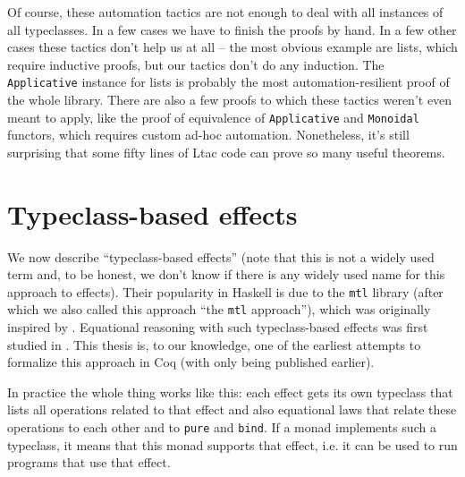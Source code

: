 \documentclass[declaration,inz,english,shortabstract]{iithesis}
\newcommand{\m}[1]{\texttt{#1}}
\begin{document}
Of course, these automation tactics are not enough to deal with all instances of all typeclasses. In a few cases we have to finish the proofs by hand. In a few other cases these tactics don't help us at all -- the most obvious example are lists, which require inductive proofs, but our tactics don't do any induction. The \m{Applicative} instance for lists is probably the most automation-resilient proof of the whole library. There are also a few proofs to which these tactics weren't even meant to apply, like the proof of equivalence of \m{Applicative} and \m{Monoidal} functors, which requires custom ad-hoc automation. Nonetheless, it's still surprising that some fifty lines of Ltac code can prove so many useful theorems.


\section{Typeclass-based effects}

We now describe ``typeclass-based effects'' (note that this is not a widely used term and, to be honest, we don't know if there is any widely used name for this approach to effects). Their popularity in Haskell is due to the \m{mtl} library (after which we also called this approach ``the \m{mtl} approach''), which was originally inspired by \cite{mtl}. Equational reasoning with such typeclass-based effects was first studied in \cite{JustDoIt}. This thesis is, to our knowledge, one of the earliest attempts to formalize this approach in Coq (with only \cite{MERC} being published earlier).


In practice the whole thing works like this: each effect gets its own typeclass that lists all operations related to that effect and also equational laws that relate these operations to each other and to \m{pure} and \m{bind}. If a monad implements such a typeclass, it means that this monad supports that effect, i.e. it can be used to run programs that use that effect.
\end{document}

